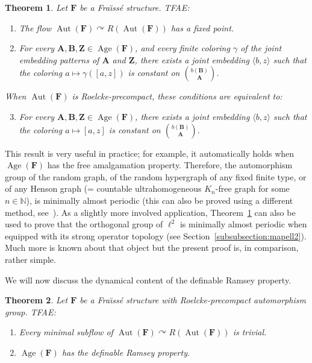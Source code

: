 \documentclass[11pt]{article}
\newtheorem{theo}{Theorem}[section]
\theoremstyle{definition}
\numberwithin{equation}{section}
\numberwithin{figure}{section}
\numberwithin{table}{section}
\newcommand{\N}{\mathbb{N}}
\newcommand*{\mA}{\mathbf{A}}
\newcommand*{\mB}{\mathbf{B}}
\newcommand*{\mF}{\mathbf{F}}
\newcommand*{\mZ}{\mathbf{Z}}
\DeclareMathOperator{\Aut}{Aut}
\DeclareMathOperator{\Age}{Age}
\newcommand{\actson}{\curvearrowright}
\begin{document}
\begin{theo}\label{thm:fpRoecke}
Let $\mF$ be a Fra\"{\i}ss\'e structure. TFAE:
\begin{enumerate}
\item \label{1.7.1} The flow $\Aut(\mF)\actson R(\Aut(\mF))$ has a fixed point.
\item \label{1.7.2} For every $\mA, \mB, \mZ\in \Age(\mF)$, and every finite coloring $\gamma$ of the joint embedding patterns of $\mA$ and $\mZ$, there exists a joint embedding $\langle b,z\rangle$ such that the coloring $a\mapsto \gamma([a,z])$ is constant on $\binom{b(\mB)}{\mA}$.
\end{enumerate}

When $\Aut(\mF)$ is Roelcke-precompact, these conditions are equivalent to:
\begin{enumerate}
\setcounter{enumi}{2}
\item \label{1.7.3} For every $\mA, \mB, \mZ\in \Age(\mF)$, there exists a joint embedding $\langle b,z\rangle$ such that the coloring $a\mapsto [a,z]$ is constant on $\binom{b(\mB)}{\mA}$.
\end{enumerate}
\end{theo}

This result is very useful in practice; for example, it automatically holds when $\Age(\mF)$ has the free amalgamation property. Therefore, the automorphism group of the random graph, of the random hypergraph of any fixed finite type, or of any Henson graph (= countable ultrahomogeneous $K_{n}$-free graph for some $n\in \N$), is minimally almost periodic (this can also be proved using a different method, see~\cite{NVT8}). As a slightly more involved application, Theorem~\ref{thm:fpRoecke} can also be used to prove that the orthogonal group of $\ell^{2}$ is minimally almost periodic when equipped with its strong operator topology (see Section~\ref{subsubsection:mapell2}). Much more is known about that object but the present proof is, in comparison, rather simple.

We will now discuss the dynamical content of the definable Ramsey property.

\begin{theo}\label{thm:minRoeckeDefRP}
Let $\mF$ be a Fra\"{\i}ss\'e structure with Roelcke-precompact automorphism group. TFAE:
\begin{enumerate}
\item Every minimal subflow of $\Aut(\mF)\actson R(\Aut(\mF))$ is trivial.
\item $\Age(\mF)$ has the definable Ramsey property.
\end{enumerate}
\end{theo}
\end{document}
